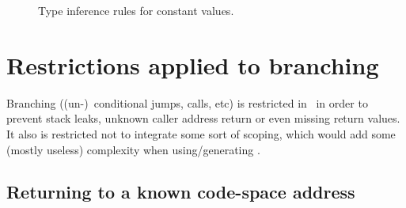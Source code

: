 \begin{figure}[htb]
  \centering


  \caption{Type inference rules for constant values.}
  \label{fig:nstar-common-constvalue-typerules}
\end{figure}

\section{Restrictions applied to branching}\label{sec:nstar-common-bs-restrictions}

Branching ((un-)\ conditional jumps, calls, etc) is restricted in \nstar\ in order to prevent stack leaks, unknown caller address return or even missing return values.
It also is restricted not to integrate some sort of scoping, which would add some (mostly useless) complexity when using/generating \nstar.

\subsection{Returning to a known code-space address}\label{subsec:nstar-common-bs-restrictions-ret}

